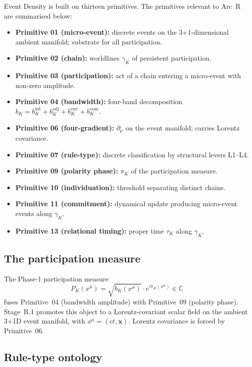 \documentclass[11pt,a4paper]{article}
\begin{document}
Event Density is built on thirteen primitives. The primitives relevant to Arc~R are summarised below:
\begin{itemize}
  \item \textbf{Primitive 01 (micro-event):} discrete events on the 3+1-dimensional ambient manifold; substrate for all participation.
  \item \textbf{Primitive 02 (chain):} worldlines $\gamma_K$ of persistent participation.
  \item \textbf{Primitive 03 (participation):} act of a chain entering a micro-event with non-zero amplitude.
  \item \textbf{Primitive 04 (bandwidth):} four-band decomposition $b_K = b_K^{\mathrm{int}} + b_K^{\mathrm{adj}} + b_K^{\mathrm{env}} + b_K^{\mathrm{com}}$.
  \item \textbf{Primitive 06 (four-gradient):} $\partial_\mu$ on the event manifold; carries Lorentz covariance.
  \item \textbf{Primitive 07 (rule-type):} discrete classification by structural levers L1--L4.
  \item \textbf{Primitive 09 (polarity phase):} $\pi_K$ of the participation measure.
  \item \textbf{Primitive 10 (individuation):} threshold separating distinct chains.
  \item \textbf{Primitive 11 (commitment):} dynamical update producing micro-event events along $\gamma_K$.
  \item \textbf{Primitive 13 (relational timing):} proper time $\tau_K$ along $\gamma_K$.
\end{itemize}

\subsection{The participation measure}

The Phase-1 participation measure
\begin{equation}
P_K(x^\mu) = \sqrt{b_K(x^\mu)} \cdot e^{i\pi_K(x^\mu)} \in \mathbb{C}
\end{equation}
fuses Primitive~04 (bandwidth amplitude) with Primitive~09 (polarity phase). Stage~R.1 promotes this object to a Lorentz-covariant scalar field on the ambient 3+1D event manifold, with $x^\mu = (ct, \mathbf{x})$. Lorentz covariance is forced by Primitive~06.

\subsection{Rule-type ontology}
\end{document}

